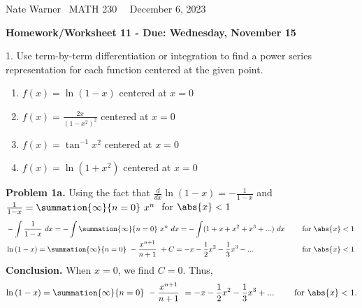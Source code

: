 \documentclass{report}
\title{\Huge{}}
\author{\huge{Nathan Warner}}
\date{\huge{}}
\begin{document}
    \pagebreak \bigbreak \noindent
    Nate Warner \ \quad \quad \quad \quad \quad \quad \quad \quad \quad \quad \quad \quad \quad \quad \quad \quad \quad  MATH 230 \quad  \quad \quad \quad \quad \quad \quad \quad \quad \ \ \quad \quad December 6, 2023
    \begin{center}
        \textbf{Homework/Worksheet 11 - Due: Wednesday, November 15}
    \end{center}
    \bigbreak \noindent 
    \begin{mdframed}
       1. Use term-by-term differentiation or integration to find a power series representation for each function centered at the given point. 
       \begin{enumerate}[label=(\alph*)]
           \item $f(x) = \ln{(1-x)}$ centered at $x=0$
           \item $f(x) = \frac{2x}{(1-x^{2})^{2}}$ centered at $x=0$
           \item $f(x) = \tan^{-1}{x^{2}}$ centered at $x=0$
           \item $f(x) = \ln{(1+x^{2})}$ centered at $x=0$
       \end{enumerate}
    \end{mdframed}
    \bigbreak \noindent 
    \textbf{Problem 1a.} Using the fact that $\frac{d}{dx}\ln{(1-x)} = -\frac{1}{1-x}$ and $\frac{1}{1-x} = \summation{\infty}{n=0}\ x^{n}\  $ for $\abs{x} < 1$
    \begin{equation}
        \begin{alignedat}{2}
        &-\int \frac{1}{1-x}\ dx = -\int \summation{\infty}{n=0}\ x^{n}\ dx = -\int (1 + x + x^{2} + x^{3} + ...)\ dx \quad \quad &&\text{ for } \abs{x}< 1 \\
        &\ln{(1-x)} = \summation{\infty}{n=0}\ -\frac{x^{n+1}}{n+1}\  + C = -x - \frac{1}{2}x^{2} - \frac{1}{3}x^{3} - ... \quad \quad &&\text{ for } \abs{x}< 1\
    \end{alignedat}
    \end{equation}
    \bigbreak \noindent 
    \textbf{Conclusion.} When $x=0$, we find $C=0$. Thus,
    \begin{align*}
        \ln{(1-x)}  = \summation{\infty}{n=0}\ -\frac{x^{n+1}}{n+1}\  = -x -\frac{1}{2}x^{2} - \frac{1}{3}x^{3} + ... \quad \quad \text{ for } \abs{x} < 1
    .\end{align*}
\end{document}
